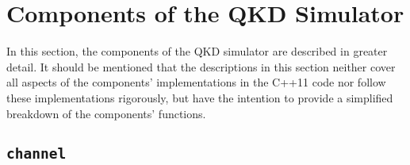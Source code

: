 \section{Components of the QKD Simulator}
\label{sec:comp}

In this section, the components of the QKD simulator are described in greater detail. It should be mentioned that the descriptions in this section neither cover all aspects of the components' implementations in the C++11 code nor follow these implementations rigorously, but have the intention to provide a simplified breakdown of the components' functions.

\subsection{\texttt{channel}}
\label{subsec:comp_channel}


